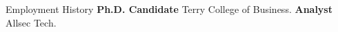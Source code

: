 \begin{rubric}{Employment History}
%
	\textbf{Ph.D. Candidate} Terry College of Business.
%
%
\entry*[2016 -- 2017]%
	\textbf{Analyst} Allsec Tech.
%
\end{rubric}
